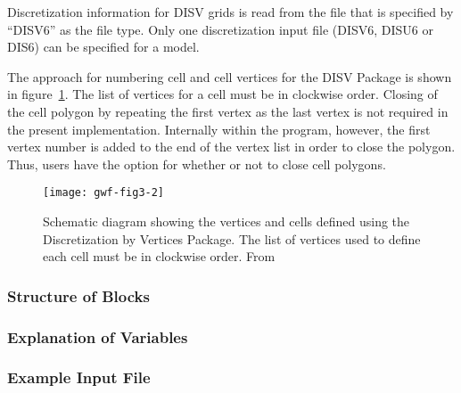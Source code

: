 Discretization information for DISV grids is read from the file that is specified by ``DISV6'' as the file type.  Only one discretization input file (DISV6, DISU6 or DIS6) can be specified for a model.

The approach for numbering cell and cell vertices for the DISV Package is shown in figure~\ref{fig:gwf-fig3-2}.  The list of vertices for a cell must be in clockwise order.  Closing of the cell polygon by repeating the first vertex as the last vertex is not required in the present implementation.  Internally within the program, however, the first vertex number is added to the end of the vertex list in order to close the polygon.  Thus, users have the option for whether or not to close cell polygons.

\begin{figure}[ht]
	\centering
	\texttt{[image: gwf-fig3-2]}
	\caption{Schematic diagram showing the vertices and cells defined using the Discretization by Vertices Package. The list of vertices used to define each cell must be in clockwise order.  From \cite{modflow6gwf}}
	\label{fig:gwf-fig3-2}
\end{figure}


\vspace{5mm}
\subsubsection{Structure of Blocks}






\vspace{5mm}
\subsubsection{Explanation of Variables}
\begin{description}

\end{description}

\vspace{5mm}
\subsubsection{Example Input File}

